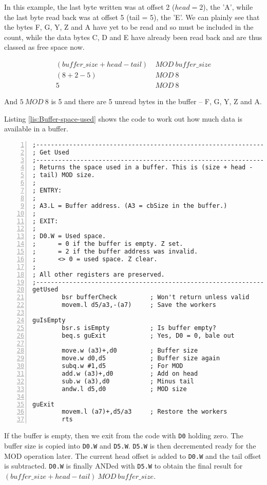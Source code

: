 In this example, the last byte written was at offset 2 ($head=2$),
the 'A', while the last byte read back was at offset 5 (tail = 5),
the 'E'. We can plainly see that the bytes F, G, Y, Z and A have yet
to be read and so must be included in the count, while the data bytes
C, D and E have already been read back and are thus classed as free
space now.

\begin{align*}
\left(buffer\_size+head-tail\right) & \ MOD\ buffer\_size\\
\left(8+2-5\right) & \ MOD\ 8\\
5 & \ MOD\ 8
\end{align*}

And $5\ MOD\ 8$ is 5 and there are 5 unread bytes in the buffer --
F, G, Y, Z and A.

Listing \ref{lis:Buffer-space-used} shows the code to work out how
much data is available in a buffer.

\begin{lstlisting}[caption={Buffer space used},label={lis:Buffer-space-used},numbers=left,showstringspaces=false,tabsize=4]
;--------------------------------------------------------------
; Get Used
;--------------------------------------------------------------
; Returns the space used in a buffer. This is (size + head -
; tail) MOD size.
; 
; ENTRY:
;
; A3.L = Buffer address. (A3 = cbSize in the buffer.)
;
; EXIT:
;
; D0.W = Used space.
;      = 0 if the buffer is empty. Z set.
;      = 2 if the buffer address was invalid.
;      <> 0 = used space. Z clear.
;
; All other registers are preserved.
;--------------------------------------------------------------
getUsed
        bsr bufferCheck         ; Won't return unless valid
        movem.l d5/a3,-(a7)     ; Save the workers

guIsEmpty
        bsr.s isEmpty           ; Is buffer empty?
        beq.s guExit            ; Yes, D0 = 0, bale out

        move.w (a3)+,d0         ; Buffer size
        move.w d0,d5            ; Buffer size again
        subq.w #1,d5            ; For MOD
        add.w (a3)+,d0          ; Add on head
        sub.w (a3),d0           ; Minus tail
        andw.l d5,d0            ; MOD size

guExit
        movem.l (a7)+,d5/a3     ; Restore the workers
        rts

\end{lstlisting}

If the buffer is empty, then we exit from the code with \texttt{D0}
holding zero. The buffer size is copied into \texttt{D0.W} and \texttt{D5.W}.
\texttt{D5.W} is then decremented ready for the MOD operation later.
The current head offset is added to \texttt{D0.W} and the tail offset
is subtracted. \texttt{D0.W} is finally ANDed with \texttt{D5.W} to
obtain the final result for $(buffer\_size+head-tail)\ MOD\ buffer\_size$.

